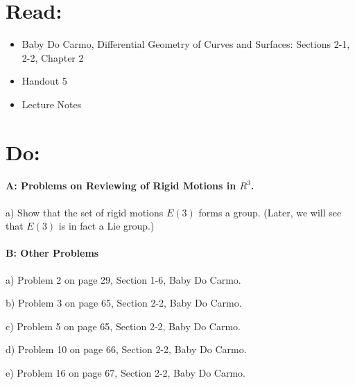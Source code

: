 \documentclass[12pt]{article}
\title{\rightline {\Huge {Due: Wed. Sept. 27}}}
\author{\LARGE {HMC\quad Math 142 \quad Fall 2017} 
\\ {Prof. Gu}  
\\ {\LARGE Problem Set 4}}
\date{Start this assignment before Sunday night!}
\begin{document}
\maketitle

\section*{ Read: } 

\begin{itemize}
\item{Baby Do Carmo, Differential Geometry
    of Curves and Surfaces:  
Sections 2-1, 2-2, Chapter 2}
\item{Handout 5}
\item{Lecture Notes}
\end{itemize}

\section*{ Do: }
\paragraph{A: Problems on Reviewing of Rigid Motions in $R^3$.}
\begin{itemize}

{\item a) Show that the set of rigid motions $E(3)$ forms a group. 
(Later, we will see that  $E(3)$ is in fact a Lie group.)} 
 
\end{itemize}

\medskip



\paragraph{B: Other Problems}
\begin{itemize}
{\item a) Problem 2 on page 29, Section 1-6, Baby Do Carmo.}
{\item b) Problem 3 on page 65, Section 2-2, Baby Do Carmo.}
{\item c) Problem 5 on page 65, Section 2-2, Baby Do Carmo.}
{\item d) Problem 10 on page 66, Section 2-2, Baby Do Carmo.}
{\item e) Problem 16 on page 67, Section 2-2, Baby Do Carmo.}

\end{itemize}
\end{document}
